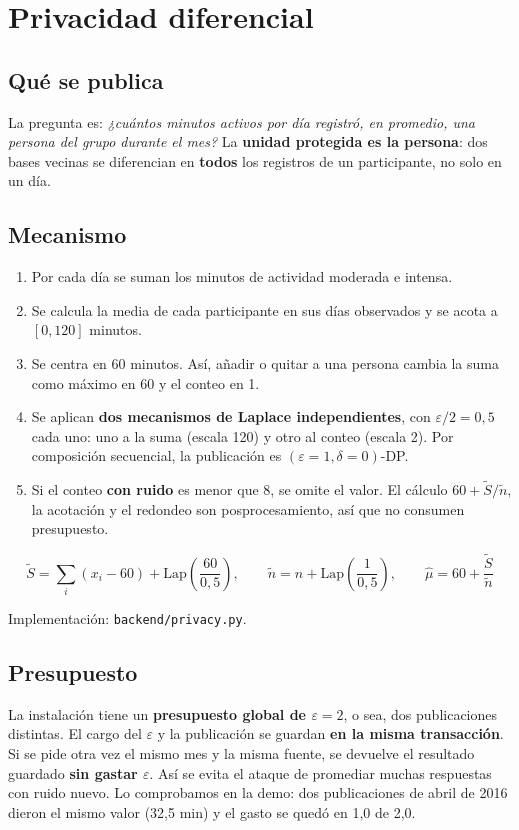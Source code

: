 \documentclass[11pt]{article}
\begin{document}
\section{Privacidad diferencial}
\label{sec:dp}

\subsection{Qué se publica}
La pregunta es: \emph{¿cuántos minutos activos por día registró, en promedio, una persona del grupo durante el mes?} La \textbf{unidad protegida es la persona}: dos bases vecinas se diferencian en \textbf{todos} los registros de un participante, no solo en un día.

\subsection{Mecanismo}
\begin{enumerate}[nosep]
  \item Por cada día se suman los minutos de actividad moderada e intensa.
  \item Se calcula la media de cada participante en sus días observados y se acota a $[0, 120]$ minutos.
  \item Se centra en 60 minutos. Así, añadir o quitar a una persona cambia la suma como máximo en 60 y el conteo en 1.
  \item Se aplican \textbf{dos mecanismos de Laplace independientes}, con $\varepsilon/2 = 0{,}5$ cada uno: uno a la suma (escala 120) y otro al conteo (escala 2). Por composición secuencial, la publicación es $(\varepsilon = 1, \delta = 0)$-DP.
  \item Si el conteo \textbf{con ruido} es menor que 8, se omite el valor. El cálculo $60 + \tilde{S}/\tilde{n}$, la acotación y el redondeo son posprocesamiento, así que no consumen presupuesto.
\end{enumerate}

\[
\tilde{S} = \sum_i (x_i - 60) + \mathrm{Lap}\!\left(\frac{60}{0{,}5}\right), \qquad
\tilde{n} = n + \mathrm{Lap}\!\left(\frac{1}{0{,}5}\right), \qquad
\hat{\mu} = 60 + \frac{\tilde{S}}{\tilde{n}}
\]

Implementación: \texttt{backend/privacy.py}.

\subsection{Presupuesto}
La instalación tiene un \textbf{presupuesto global de $\varepsilon = 2$}, o sea, dos publicaciones distintas. El cargo del $\varepsilon$ y la publicación se guardan \textbf{en la misma transacción}. Si se pide otra vez el mismo mes y la misma fuente, se devuelve el resultado guardado \textbf{sin gastar $\varepsilon$}. Así se evita el ataque de promediar muchas respuestas con ruido nuevo. Lo comprobamos en la demo: dos publicaciones de abril de 2016 dieron el mismo valor (32,5 min) y el gasto se quedó en 1,0 de 2,0.
\end{document}
